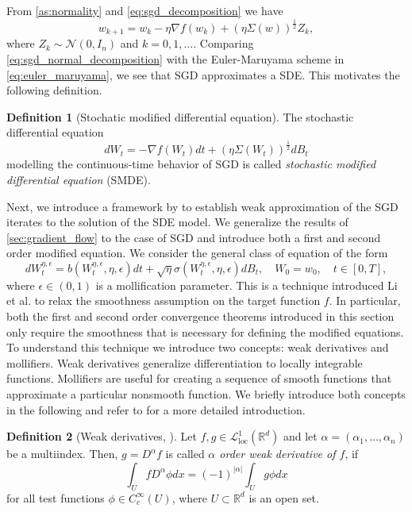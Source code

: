 \documentclass[12pt]{article}
\theoremstyle{definition}
\newtheorem{definition}[definition]{Definition}
\numberwithin{equation}{section}
\newcommand{\R}{\mathbb{R}}
\newcommand{\CL}{\mathcal{L}}
\newcommand{\CN}{\mathcal{N}}
\begin{document}
From \autoref{as:normality} and \eqref{eq:sgd_decomposition} we have
\begin{equation}
  \label{eq:sgd_normal_decomposition}
  w_{k+1} = w_{k} - \eta \nabla f(w_{k}) + (\eta \Sigma(w))^{\frac{1}{2}} Z_k,
\end{equation}
where $Z_k \sim \CN(0,I_n)$ and $k=0,1,\dots$. Comparing \eqref{eq:sgd_normal_decomposition} with the Euler-Maruyama scheme in \eqref{eq:euler_maruyama}, we see that SGD approximates a SDE. This motivates the following definition.
\begin{definition}[Stochatic modified differential equation]
  The stochastic differential equation
  \begin{equation*}
    dW_t = -\nabla f(W_t)dt + (\eta \Sigma(W_t))^{\frac{1}{2}}dB_t
  \end{equation*}
  modelling the continuous-time behavior of SGD is called \emph{stochastic modified differential equation} (SMDE).
\end{definition}
Next, we introduce a framework by \autocite{liStochasticModifiedEquations2019} to establish weak approximation of the SGD iterates to the solution of the SDE model. We generalize the results of \autoref{sec:gradient_flow} to the case of SGD and introduce both a first and second order modified equation.
We consider the general class of equation of the form
\begin{equation}
  \label{eq:general_sde}
  dW^{\eta, \epsilon}_t = b(W^{\eta, \epsilon}_t, \eta, \epsilon)dt + \sqrt{\eta}\sigma(W^{\eta, \epsilon}_t, \eta, \epsilon)dB_t, \quad W_0 = w_0, \quad t \in [0,T],
\end{equation}
where $\epsilon \in (0,1)$ is a mollification parameter. This is a technique introduced Li et al. \cite{liStochasticModifiedEquations2019} to relax the smoothness assumption on the target function $f$. In particular, both the first and second order convergence theorems introduced in this section only require the smoothness that is necessary for defining the modified equations.
To understand this technique we introduce two concepts: weak derivatives and mollifiers. Weak derivatives generalize differentiation to locally integrable functions. Mollifiers are useful for creating a sequence of smooth functions that approximate a particular nonsmooth function. We briefly introduce both concepts in the following and refer to \cite{evansPartialDifferentialEquations2010} for a more detailed introduction.
\begin{definition}[Weak derivatives, ]
  Let $f,g \in \CL^1_{\text{loc}}(\R^d)$ and let $\alpha = (\alpha_1, \dots, \alpha_n)$ be a multiindex. Then, $g = D^{\alpha} f$ is called \emph{$\alpha$ order weak derivative of $f$}, if
  \begin{equation}
    \label{eq:weak_derivative}
    \int_U f D^{\alpha} \phi dx = (-1)^{|\alpha|} \int_U g \phi dx
  \end{equation}
  for all test functions $\phi \in C_c^{\infty}(U)$, where $U \subset \R^d$ is an open set.
\end{definition}
\end{document}
